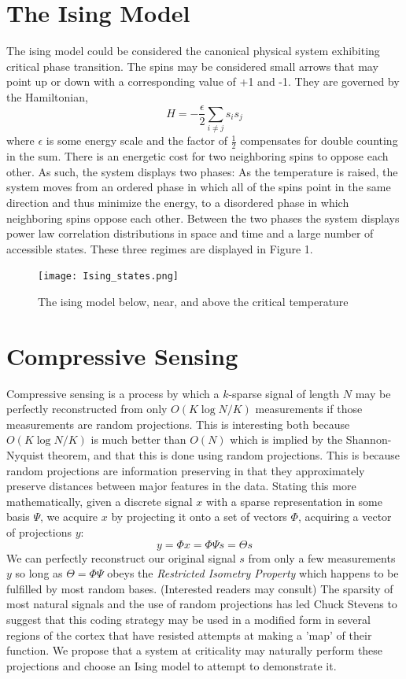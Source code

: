 \documentclass{article} %
\begin{document}
\section{The Ising Model}
The ising model could be considered the canonical physical system exhibiting
critical phase transition.  The spins may be considered small arrows that may
point up or down with a corresponding value of +1 and -1. They are governed by
the Hamiltonian,
\[H = -\frac{\epsilon}{2} \sum_{i\neq j} s_i s_j\]
where $\epsilon$ is some energy scale and the factor of $\frac{1}{2}$
compensates for double counting in the sum.  There is an energetic cost for two
neighboring spins to oppose each other.  As such, the system displays two phases:
As the temperature is raised, the system moves from an ordered phase in which
all of the spins point in the same direction and thus minimize the energy, to a
disordered phase in which neighboring spins oppose each other. Between the two
phases the system displays power law correlation distributions in space and time
and a large number of accessible states.  These three regimes are displayed in
Figure 1.
\begin{figure}[h]
\begin{center}
\texttt{[image: Ising\_states.png]}
\end{center}
\caption{The ising model below, near, and above the critical temperature}
\end{figure}

\section{Compressive Sensing}
Compressive sensing is a process by which a $k$-sparse signal of length $N$ may
be perfectly reconstructed from only $O(K\log{N/K})$ measurements if those
measurements are random projections.\cite{Candes2008} This
is interesting both because $O(K\log{N/K})$ is much better than $O(N)$ which is
implied by the Shannon-Nyquist theorem, and that this is done using random
projections.  This is because random projections are information preserving in
that they approximately preserve distances between major features in the data.
Stating this more mathematically, given a discrete signal $x$ with a sparse
representation in some basis $\Psi$, we acquire $x$ by projecting it onto a set
of vectors $\Phi$, acquiring a vector of projections $y$:
\[y = \Phi x = \Phi \Psi s = \Theta s\]
We can perfectly reconstruct our original signal $s$ from only a few
measurements $y$ so long as $\Theta = \Phi\Psi$ obeys the \emph{Restricted
Isometry Property} which happens to be fulfilled by most random bases.
(Interested readers may consult\cite{Candes2008}\cite{Baraniuk2007}) The sparsity of
most natural signals and the use of random projections has led Chuck Stevens to
suggest that this coding strategy may be used in a modified form in several
regions of the cortex that have resisted attempts at making a 'map' of their
function.  We propose that a system at criticality may naturally perform these
projections and choose an Ising model to attempt to demonstrate it.
\end{document}
